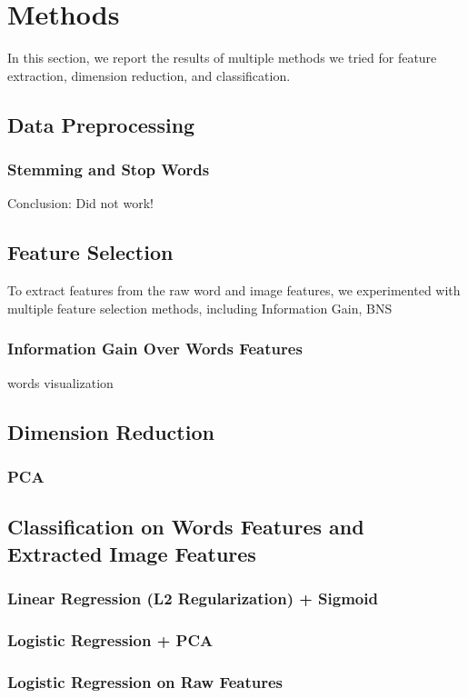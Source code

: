 \section{Methods}
In this section, we report the results of multiple methods we tried for feature extraction, dimension reduction, and classification. 

\subsection{Data Preprocessing}
\subsubsection{Stemming and Stop Words}
Conclusion: Did not work!

\subsection{Feature Selection}
To extract features from the raw word and image features, we experimented with multiple feature selection methods, including Information Gain, BNS
\subsubsection{Information Gain Over Words Features}
words visualization
\subsection{Dimension Reduction}
\subsubsection{PCA}

\subsection{Classification on Words Features and Extracted Image Features}
\subsubsection{Linear Regression (L2 Regularization) + Sigmoid}
\subsubsection{Logistic Regression + PCA}
\subsubsection{Logistic Regression on Raw Features}
